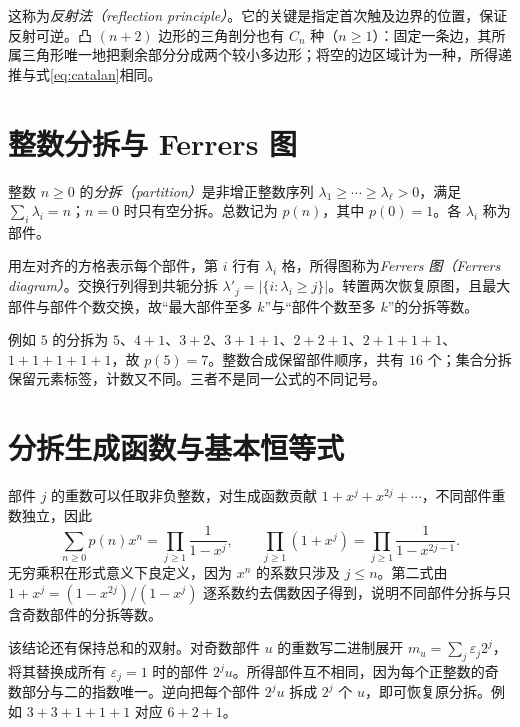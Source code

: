 这称为\emph{反射法（reflection principle）}。它的关键是指定首次触及边界的位置，保证反射可逆。凸 $(n+2)$ 边形的三角剖分也有 $C_n$ 种（$n\ge1$）：固定一条边，其所属三角形唯一地把剩余部分分成两个较小多边形；将空的边区域计为一种，所得递推与式\eqref{eq:catalan}相同。

\section{整数分拆与 Ferrers 图}

\begin{definition}
整数 $n\ge0$ 的\emph{分拆（partition）}是非增正整数序列 $\lambda_1\ge\cdots\ge\lambda_\ell>0$，满足 $\sum_i\lambda_i=n$；$n=0$ 时只有空分拆。总数记为 $p(n)$，其中 $p(0)=1$。各 $\lambda_i$ 称为部件。
\end{definition}

用左对齐的方格表示每个部件，第 $i$ 行有 $\lambda_i$ 格，所得图称为\emph{Ferrers 图（Ferrers diagram）}。交换行列得到共轭分拆 $\lambda'_j=|\{i:\lambda_i\ge j\}|$。转置两次恢复原图，且最大部件与部件个数交换，故“最大部件至多 $k$”与“部件个数至多 $k$”的分拆等数。

例如 $5$ 的分拆为 $5$、$4+1$、$3+2$、$3+1+1$、$2+2+1$、$2+1+1+1$、$1+1+1+1+1$，故 $p(5)=7$。整数合成保留部件顺序，共有 $16$ 个；集合分拆保留元素标签，计数又不同。三者不是同一公式的不同记号。

\section{分拆生成函数与基本恒等式}

部件 $j$ 的重数可以任取非负整数，对生成函数贡献 $1+x^j+x^{2j}+\cdots$，不同部件重数独立，因此
\begin{equation}
 \sum_{n\ge0}p(n)x^n=\prod_{j\ge1}\frac1{1-x^j},\qquad
 \prod_{j\ge1}(1+x^j)=\prod_{j\ge1}\frac1{1-x^{2j-1}}.
 \label{eq:partition-products}
\end{equation}
无穷乘积在形式意义下良定义，因为 $x^n$ 的系数只涉及 $j\le n$。第二式由 $1+x^j=(1-x^{2j})/(1-x^j)$ 逐系数约去偶数因子得到，说明不同部件分拆与只含奇数部件的分拆等数。

该结论还有保持总和的双射。对奇数部件 $u$ 的重数写二进制展开 $m_u=\sum_j\varepsilon_j2^j$，将其替换成所有 $\varepsilon_j=1$ 时的部件 $2^ju$。所得部件互不相同，因为每个正整数的奇数部分与二的指数唯一。逆向把每个部件 $2^ju$ 拆成 $2^j$ 个 $u$，即可恢复原分拆。例如 $3+3+1+1+1$ 对应 $6+2+1$。

